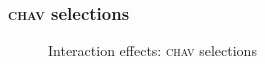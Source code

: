 \documentclass[PWPL]{article}
\begin{document}
\subsubsection{\textsc{chav} selections}
\begin{figure}[ht]
\centering
\caption{Interaction effects: \textsc{chav} selections}
\end{figure}
\end{document}
